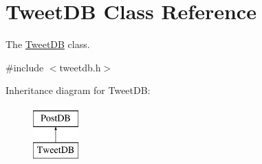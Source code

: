 \hypertarget{classTweetDB}{}\section{Tweet\+DB Class Reference}
\label{classTweetDB}


The \hyperlink{classTweetDB}{Tweet\+DB} class.  




{\ttfamily \#include $<$tweetdb.\+h$>$}

Inheritance diagram for Tweet\+DB\+:\begin{figure}[H]
\begin{center}
\leavevmode
\includegraphics[height=2.000000cm]{classTweetDB}
\end{center}
\end{figure}
